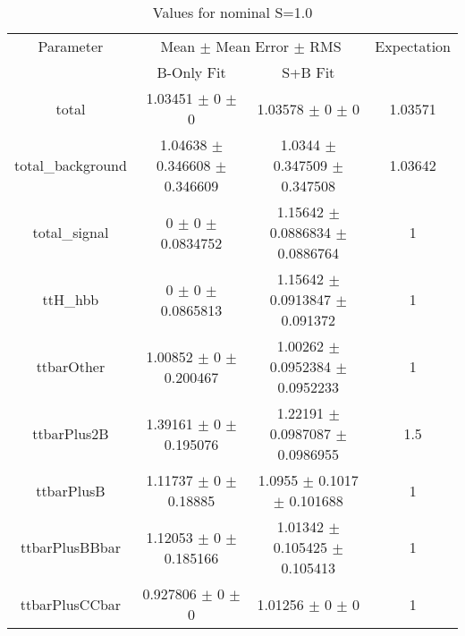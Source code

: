 \begin{table}
\centering
\caption{Values for nominal S=1.0}
\begin{tabular}{cccc}
\toprule
Parameter & \multicolumn{2}{c}{Mean $\pm$ Mean Error $\pm$ RMS} & Expectation\\
 & B-Only Fit & S+B Fit & \\
\midrule
total & \num{1.03451} $\pm$ \num{0} $\pm$ \num{0} & \num{1.03578} $\pm$ \num{0} $\pm$ \num{0} & \num{1.03571}\\
total\_background & \num{1.04638} $\pm$ \num{0.346608} $\pm$ \num{0.346609} & \num{1.0344} $\pm$ \num{0.347509} $\pm$ \num{0.347508} & \num{1.03642}\\
total\_signal & \num{0} $\pm$ \num{0} $\pm$ \num{0.0834752} & \num{1.15642} $\pm$ \num{0.0886834} $\pm$ \num{0.0886764} & \num{1}\\
ttH\_hbb & \num{0} $\pm$ \num{0} $\pm$ \num{0.0865813} & \num{1.15642} $\pm$ \num{0.0913847} $\pm$ \num{0.091372} & \num{1}\\
ttbarOther & \num{1.00852} $\pm$ \num{0} $\pm$ \num{0.200467} & \num{1.00262} $\pm$ \num{0.0952384} $\pm$ \num{0.0952233} & \num{1}\\
ttbarPlus2B & \num{1.39161} $\pm$ \num{0} $\pm$ \num{0.195076} & \num{1.22191} $\pm$ \num{0.0987087} $\pm$ \num{0.0986955} & \num{1.5}\\
ttbarPlusB & \num{1.11737} $\pm$ \num{0} $\pm$ \num{0.18885} & \num{1.0955} $\pm$ \num{0.1017} $\pm$ \num{0.101688} & \num{1}\\
ttbarPlusBBbar & \num{1.12053} $\pm$ \num{0} $\pm$ \num{0.185166} & \num{1.01342} $\pm$ \num{0.105425} $\pm$ \num{0.105413} & \num{1}\\
ttbarPlusCCbar & \num{0.927806} $\pm$ \num{0} $\pm$ \num{0} & \num{1.01256} $\pm$ \num{0} $\pm$ \num{0} & \num{1}\\
\bottomrule
\end{tabular}
\end{table}